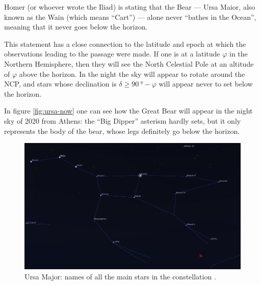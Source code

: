 \documentclass[main.tex]{subfiles}
\begin{document}
Homer (or whoever wrote the Iliad) is stating that the Bear --- Ursa Maior, also known as the Wain (which means ``Cart'') --- alone never ``bathes in the Ocean'', meaning that it never goes below the horizon. 

This statement has a close connection to the latitude and epoch at which the observations leading to the passage were made. 
If one is at a latitude \(\varphi \) in the Northern Hemisphere, then they will see the North Celestial Pole at an altitude of \(\varphi \) above the horizon. In the night the sky will appear to rotate around the NCP, and stars whose declination is \(\delta \geq \SI{90}{\degree} - \varphi \) will appear never to set below the horizon. 

In figure \ref{fig:ursa-now} one can see how the Great Bear will appear in the night sky of 2020 from Athens: the ``Big Dipper'' asterism hardly sets, but it only represents the body of the bear, whose legs definitely go below the horizon. 

\begin{figure}[ht]
\centering
\includegraphics[width=\textwidth]{figures/ursa_names.png}
\caption{Ursa Major: names of all the main stars in the constellation \cite[]{stellariumcontributorsStellariumAstronomySoftware2020}.}
\label{fig:ursa-names}
\end{figure}
\end{document}
